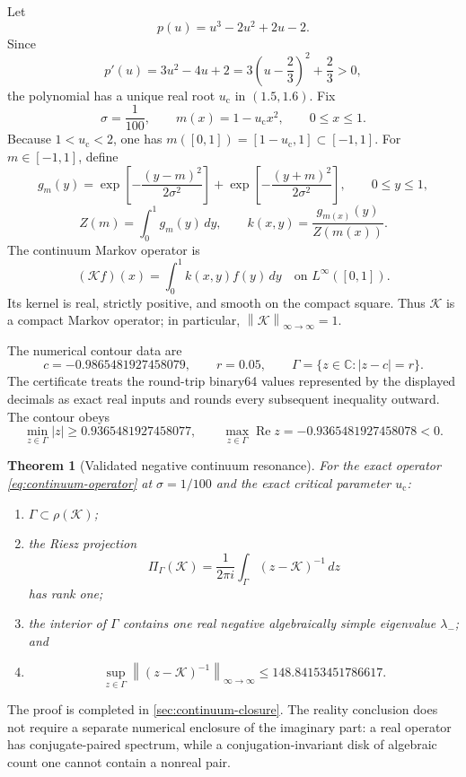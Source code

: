 \documentclass[11pt]{article}
\newtheorem{theorem}{Theorem}[section]
\theoremstyle{definition}
\theoremstyle{remark}
\newcommand{\C}{\mathbb C}
\newcommand{\cK}{\mathcal K}
\newcommand{\uc}{u_{\mathrm c}}
\newcommand{\norm}[1]{\left\lVert #1\right\rVert}
\begin{document}
Let
\[
 p(u)=u^3-2u^2+2u-2.
\]
Since
\[
 p'(u)=3u^2-4u+2
      =3\left(u-\frac23\right)^2+\frac23>0,
\]
the polynomial has a unique real root $\uc$ in $(1.5,1.6)$.  Fix
\[
 \sigma=\frac1{100},\qquad m(x)=1-\uc x^2,\qquad 0\le x\le1.
\]
Because $1<\uc<2$, one has
$m([0,1])=[1-\uc,1]\subset[-1,1]$.
For $m\in[-1,1]$, define
\[
 g_m(y)=
 \exp\!\left[-\frac{(y-m)^2}{2\sigma^2}\right]
 +
 \exp\!\left[-\frac{(y+m)^2}{2\sigma^2}\right],
 \qquad 0\le y\le1,
\]
\[
 Z(m)=\int_0^1g_m(y)\,dy,
 \qquad
 k(x,y)=\frac{g_{m(x)}(y)}{Z(m(x))}.
\]
The continuum Markov operator is
\begin{equation}
 (\cK f)(x)=\int_0^1k(x,y)f(y)\,dy
 \quad\text{on }L^\infty([0,1]).
 \label{eq:continuum-operator}
\end{equation}
Its kernel is real, strictly positive, and smooth on the compact square.
Thus $\cK$ is a compact Markov operator; in particular,
$\norm{\cK}_{\infty\to\infty}=1$.

The numerical contour data are
\begin{equation}
 c=-0.9865481927458079,\qquad
 r=0.05,\qquad
 \Gamma=\{z\in\C:|z-c|=r\}.
 \label{eq:main-contour}
\end{equation}
The certificate treats the round-trip binary64 values represented by the
displayed decimals as exact real inputs and rounds every subsequent
inequality outward.  The contour obeys
\[
 \min_{z\in\Gamma}|z|
 \ge0.9365481927458077,
 \qquad
 \max_{z\in\Gamma}\operatorname{Re}z
 =-0.9365481927458078<0.
\]

\begin{theorem}[Validated negative continuum resonance]
\label{thm:main}
For the exact operator \eqref{eq:continuum-operator} at
$\sigma=1/100$ and the exact critical parameter $\uc$:
\begin{enumerate}[label=\textup{(\roman*)}]
 \item $\Gamma\subset\rho(\cK)$;
 \item the Riesz projection
 \[
   \Pi_\Gamma(\cK)
   =\frac{1}{2\pi i}\int_\Gamma(z-\cK)^{-1}\,dz
 \]
 has rank one;
 \item the interior of $\Gamma$ contains one real negative algebraically
 simple eigenvalue $\lambda_-$; and
 \item
 \[
  \sup_{z\in\Gamma}\norm{(z-\cK)^{-1}}_{\infty\to\infty}
  \le148.84153451786617.
 \]
\end{enumerate}
\end{theorem}

The proof is completed in \cref{sec:continuum-closure}.  The reality
conclusion does not require a separate numerical enclosure of the imaginary
part: a real operator has conjugate-paired spectrum, while a
conjugation-invariant disk of algebraic count one cannot contain a nonreal
pair.
\end{document}

